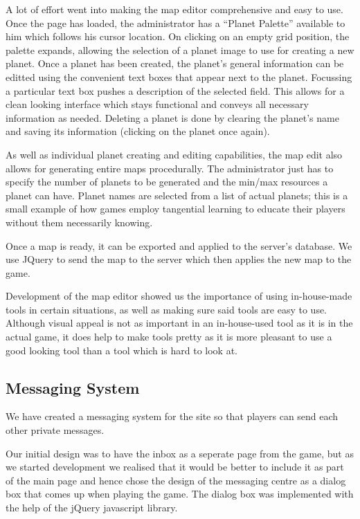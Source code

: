 \documentclass[a4paper,11pt]{article}
\begin{document}
		A lot of effort went into making the map editor comprehensive and easy to use. Once the page has loaded, the administrator has a ``Planet Palette'' available to him which follows his cursor location. On clicking on an empty grid position, the palette expands, allowing the selection of a planet image to use for creating a new planet. Once a planet has been created, the planet's general information can be editted using the convenient text boxes that appear next to the planet. Focussing a particular text box pushes a description of the selected field. This allows for a clean looking interface which stays functional and conveys all necessary information as needed. Deleting a planet is done by clearing the planet's name and saving its information (clicking on the planet once again).

		As well as individual planet creating and editing capabilities, the map edit also allows for generating entire maps procedurally. The administrator just has to specify the number of planets to be generated and the min/max resources a planet can have. Planet names are selected from a list of actual planets; this is a small example of how games employ tangential learning to educate their players without them necessarily knowing.

		Once a map is ready, it can be exported and applied to the server's database. We use JQuery to send the map to the server which then applies the new map to the game.

		Development of the map editor showed us the importance of using in-house-made tools in certain situations, as well as making sure said tools are easy to use. Although visual appeal is not as important in an in-house-used tool as it is in the actual game, it does help to make tools pretty as it is more pleasant to use a good looking tool than a tool which is hard to look at.
		
		\subsection{Messaging System}
		We have created a messaging system for the site so that players can send each other private messages.

		Our initial design was to have the inbox as a seperate page from the game, but as we started development we realised that it would be better to include it as part of the main page and hence chose the design of the messaging centre as a dialog box that comes up when playing the game.
		The dialog box was implemented with the help of the jQuery javascript library.
\end{document}

